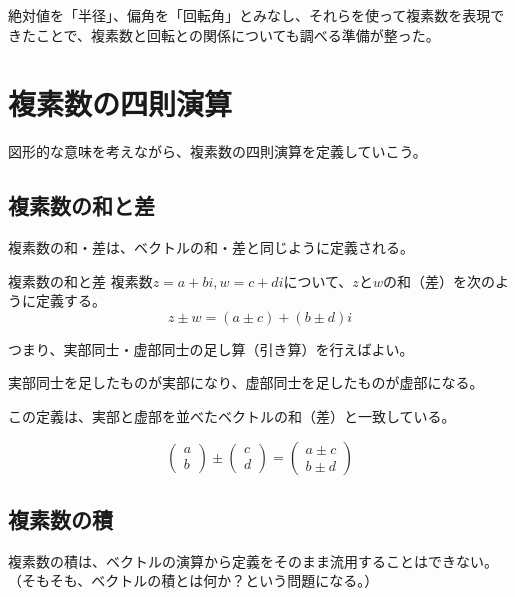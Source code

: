 \documentclass[../math-imaging]{subfiles}
\begin{document}
絶対値を「半径」、偏角を「回転角」とみなし、それらを使って複素数を表現できたことで、複素数と回転との関係についても調べる準備が整った。

\section{複素数の四則演算}

図形的な意味を考えながら、複素数の四則演算を定義していこう。

\subsection{複素数の和と差}

複素数の和・差は、ベクトルの和・差と同じように定義される。

\begin{definition}{複素数の和と差}
  \newline
  複素数$z=a+bi, w = c +di$について、$z$と$w$の和（差）を次のように定義する。
  \LARGE
  \begin{equation}
    z \pm w = (a \pm c) + (b \pm d)i
  \end{equation}
\end{definition}

つまり、実部同士・虚部同士の足し算（引き算）を行えばよい。

実部同士を足したものが実部になり、虚部同士を足したものが虚部になる。

この定義は、実部と虚部を並べたベクトルの和（差）と一致している。

\begin{equation}
  \begin{pmatrix}
    a \\
    b
  \end{pmatrix} \pm \begin{pmatrix}
    c \\
    d
  \end{pmatrix} = \begin{pmatrix}
    a \pm c \\
    b \pm d
  \end{pmatrix}
\end{equation}

\subsection{複素数の積}

複素数の積は、ベクトルの演算から定義をそのまま流用することはできない。
（そもそも、ベクトルの積とは何か？という問題になる。）
\end{document}
